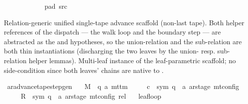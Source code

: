 \begin{isabellebody}
\ \ \ \ \ \ \ \ \ \ \ \ pad{}\ src{}{\isacharbrackright}{\kern0pt}{\isacharparenright}{\kern0pt}%
\endisatagproof
{\isafoldproof}%
%
\isadelimproof
%
\endisadelimproof
%
\begin{isamarkuptext}%
Relation-generic unified single-tape advance scaffold
  (non-last tape).  Both helper references of the dispatch ---
  the walk loop and the boundary step --- are abstracted as the
   and  hypotheses, so the
  union-relation  and the sub-relation
   are both thin instantiations
  (discharging the two leaves by the union- resp. sub-relation
  helper lemmas).  Multi-leaf instance of the leaf-parametric
  scaffold; no 
  side-condition since both leaves' chains are native to .%
\end{isamarkuptext}\isamarkuptrue%
\isamarkupfalse%
\ ar{\isacharunderscore}{\kern0pt}advance{\isacharunderscore}{\kern0pt}tape{\isacharunderscore}{\kern0pt}step{\isacharunderscore}{\kern0pt}gen{\isacharcolon}{\kern0pt}\isanewline
\ \ \ M\ {\isacharcolon}{\kern0pt}{\isacharcolon}{\kern0pt}\ {\isachardoublequoteopen}{\isacharparenleft}{\kern0pt}{\isacharprime}{\kern0pt}q{\isacharcomma}{\kern0pt}\ {\isacharprime}{\kern0pt}a{\isacharparenright}{\kern0pt}\ mttm{\isachardoublequoteclose}\isanewline
\ \ \ \ \ c{}\ {\isacharcolon}{\kern0pt}{\isacharcolon}{\kern0pt}\ {\isachardoublequoteopen}{\isacharparenleft}{\kern0pt}sym{}{\isacharcomma}{\kern0pt}\ {\isacharprime}{\kern0pt}q\ {\isasymtimes}\ {\isacharprime}{\kern0pt}a\ ar{\isacharunderscore}{\kern0pt}stage{\isacharparenright}{\kern0pt}\ mt{\isacharunderscore}{\kern0pt}config{\isachardoublequoteclose}\isanewline
\ \ \ \ \ R{\isacharprime}{\kern0pt}\ {\isacharcolon}{\kern0pt}{\isacharcolon}{\kern0pt}\ {\isachardoublequoteopen}{\isacharparenleft}{\kern0pt}sym{}{\isacharcomma}{\kern0pt}\ {\isacharprime}{\kern0pt}q\ {\isasymtimes}\ {\isacharprime}{\kern0pt}a\ ar{\isacharunderscore}{\kern0pt}stage{\isacharparenright}{\kern0pt}\ mt{\isacharunderscore}{\kern0pt}config\ rel{\isachardoublequoteclose}\isanewline
\ \ \ leaf{\isacharunderscore}{\kern0pt}loop{\isacharcolon}{\kern0pt}\isanewline

\end{isabellebody}
